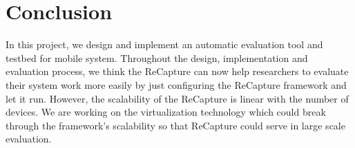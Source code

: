\section{Conclusion}\label{sec:conclusion}
In this project, we design and implement an automatic evaluation tool and testbed for mobile system. Throughout the design, implementation and evaluation process, we think the ReCapture can now help researchers to evaluate their system work more easily by just configuring the ReCapture framework and let it run. However, the scalability of the ReCapture is linear with the number of devices. We are working on the virtualization technology which could break through the framework's scalability so that ReCapture could serve in large scale evaluation.

